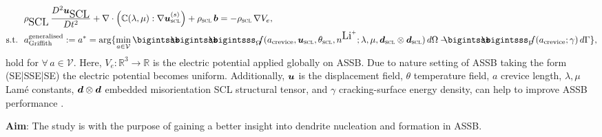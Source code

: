 \documentclass[25pt, a0paper,
portrait,
margin=2mm, 
innermargin=2mm, 
blockverticalspace=7mm, %
colspace=2mm, %
subcolspace=0mm]{tikzposter}
\makeatletter
\newcommand*{\inputfig}[3][htb]{{
    \def\fps@figure{#1}
    \def\DIR{#2}
    \def\LABEL{#3}
    \graphicspath{{\DIR/}}
    
}}
\makeatother
\begin{document}
{\begin{minipage}{0.56\textwidth}
\begin{mdframed}
			\begin{align}
				 & \rho_{\text{\tiny SCL}}\,
				\frac{D^2 \Bu_{\text{\tiny SCL}}}{D t^2}
				+
				\nabla \cdot
				\Big(
				\mathbb{C}(\lambda,\mu)
				:\nabla\Bu^{(s)}_{\textsc{scl}}
				\Big)
				+ \rho_{\textsc{scl}}\,\Bb
				= -\rho_{\textsc{scl}}\,\nabla V_{e}, \\
				\text{s.t.}\ \
				 & 
				a_{\text{Griffith}}^{\text{generalised}} := a^{*}
				= \arg \{ \min_{a\in\mathcal{V}}
				{
				\bigintsss\!\!\!\!\!\!\bigintsss\!\!\!\!\!\!\bigintsss_{\Omega}
				\!\!
				f(a_{\text{crevice}},\bm{u}_{\textsc{scl}},\theta_{\textsc{scl}},n^{\text{\tiny Li}^{\tiny +}};\lambda,\mu,\bm{d}_{\textsc{scl}}\otimes\bm{d}_{\textsc{scl}}) \, d\Omega
				- 
				\!\!\!\!
				\bigintsss\!\!\!\!\!\!\bigintsss_{\Gamma}
				\!\!
				f(a_{\text{crevice}};\gamma) \, d\Gamma
				}
				\},
			\end{align}
			hold for $\forall\,a\in\mathcal{V}$.
			Here, $V_{e}: \mathbb{R}^{3}\to\mathbb{R}$
			is the electric potential applied globally on ASSB.
			Due to nature setting of ASSB taking the form
			(SE|SSE|SE)
			the electric potential becomes uniform.
			Additionally,
			${\boldsymbol{\mathnormal u}}$ is the displacement field,
			$\theta$ temperature field,
			$a$ crevice length,
			$\lambda, \mu$ Lam\'{e} constants,
			${\boldsymbol{\mathnormal d}}\otimes{\boldsymbol{\mathnormal d}}$ embedded misorientation SCL structural tensor,
			and
			$\gamma$ cracking-surface energy density,
			can help
			to improve ASSB performance
			\cite{vo2023_obms23}\cite{vo2023_cse23}.
		\end{mdframed}
		\vspace{-2mm}
		\begin{mdframed}
			\textbf{Aim}:
			The study is with the purpose of
			gaining a better insight into dendrite nucleation and formation in ASSB.
		\end{mdframed}
	\end{minipage}%
	\hfill
	\begin{minipage}{0.44\textwidth}
		\begin{center}
			\inputfig{floats/routine_woTV_spectral_boschcolor}{routine_woTV_spectral_boschcolor}
			\inputfig{floats/dendrite_SESSE}{dendrite_SESSE}
		\end{center}
	\end{minipage}
	\vspace{-0.3cm}
}
\end{document}
